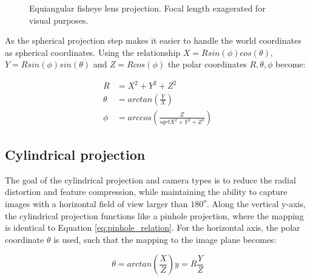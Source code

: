 \begin{figure}[!htb]
    
    \caption{Equiangular fisheye lens projection. Focal length exagerated for visual purposes.}
    \label{fig:fisheye_spherical_projection}
\end{figure}

As the spherical projection step makes it easier to handle the world coordinates as spherical coordinates. Using the relationship $X = Rsin(\phi)cos(\theta)$, $Y = Rsin(\phi)sin(\theta)$ and $Z = Rcos(\phi)$ the polar coordinates $R,\theta,\phi$ become:

\begin{equation}
    \begin{aligned}
        R &= X^2 + Y^2 + Z^2 \\
        \theta &= arctan\left(\frac{Y}{X}\right) \\
        \phi &= arccos\left(\frac{Z}{sqrt{X^2 + Y^2 + Z^2}}\right)
    \end{aligned}
    \label{theory_polar_coords}
\end{equation}

\subsection{Cylindrical projection}

The goal of the cylindrical projection and camera types is to reduce the radial distortion and feature compression, while maintaining the ability to capture images with a horizontal field of view larger than $180^o$. Along the vertical y-axis, the cylindrical projection functions like a pinhole projection, where the mapping is identical to Equation \eqref{eq:pinhole_relation}. For the horizontal axis, the polar coordinate $\theta$ is used, such that the mapping to the image plane becomes:

\begin{subequations}
\begin{equation}
    \theta = arctan\left(\frac{X}{Z}\right)
    \label{eq:cylindrical_theta}
\end{equation}
\begin{equation}
    y = R\frac{Y}{Z}
    \label{eq:cylindrical_y}
\end{equation}
\label{eq:cylindrical}
\end{subequations}

